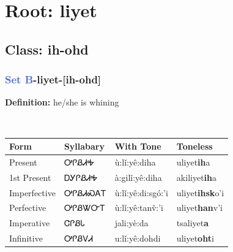 \needspace{4in}
\section*{Root: liyet}
\nopagebreak
{}
\needspace{3in}
\subsection*{Class: ih-ohd}
\nopagebreak
\needspace{2in}
\subsubsection*{\textcolor{RoyalBlue}{Set B}{-}\textbf{liyet}{-}[ih-ohd]}
\nopagebreak
\textbf{Definition: } he/she is whining
\\[0.5em]
\begin{tabularx}{\textwidth}{l X X X}%
\toprule%
\textbf{Form}&\textbf{Syllabary}&\textbf{With Tone}&\textbf{Toneless}\\%
\midrule%
Present&ᎤᎵᏰᏗᎭ&ù:lǐ:yê:diha&uliyet\textbf{ih}a\\%
1st Present&ᎠᎩᎵᏰᏗᎭ&à:gilǐ:yê:diha&akiliyet\textbf{ih}a\\%
Imperfective&ᎤᎵᏰᏗᏍᎪᎢ&ù:lǐ:yê:di:sgó:’i&uliyet\textbf{ihsk}o'i\\%
Perfective&ᎤᎵᏰᏔᏅᎢ&ù:lǐ:yê:tanv̌:’i&uliyet\textbf{han}v'i\\%
Imperative&ᏣᎵᏰᏓ&jali:yè:da&tsaliyet\textbf{a}\\%
Infinitive&ᎤᎵᏰᏙᏗ&u:lǐ:yê:dohdi&uliyet\textbf{oht}i\\%
\bottomrule%
\end{tabularx}
\\[1em]